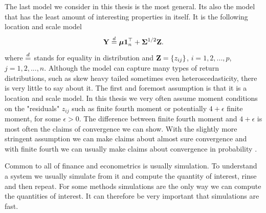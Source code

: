 \documentclass[oneside]{book}\usepackage{knitr}
\begin{document}
% 
The last model we consider in this thesis is the most general.
Its also the model that has the least amount of interesting properties in itself.
It is the following location and scale model
\begin{equation}\label{eqn:location_scale_model}
\mathbf{Y} \stackrel{d}{=} \mbox{\boldmath$\mu$} \mathbf{1}^\top_n + \mathbf{\Sigma}^{1/2} \mathbf{Z}.
\end{equation}
where $\stackrel{d}{=}$ stands for equality in distribution and $\mathbf{Z} = \{z_{ij}\}$, $i=1,2,...,p$, $j=1,2,...,n$.
Although the model can capture many types of return distributions, such as skew heavy tailed sometimes even heteroscedasticity, there is very little to say about it.
The first and foremost assumption is that it is a location and scale model.
In this thesis we very often assume moment conditions on the "residuals" $z_{ij}$ such as finite fourth moment or potentially $4+\epsilon$ finite moment, for some $\epsilon>0$.
The difference between finite fourth moment and $4+\epsilon$ is most often the claims of convergence we can show.
With the slightly more stringent assumption we can make claims about almost sure convergence and with finite fourth we can usually make claims about convergence in probability \citet{REF}.

Common to all of finance and econometrics is usually simulation. 
To understand a system we usually simulate from it and compute the quantity of interest, rinse and then repeat.
For some methods simulations are the only way we can compute the quantities of interest.
It can therefore be very important that simulations are fast.
\end{document}

